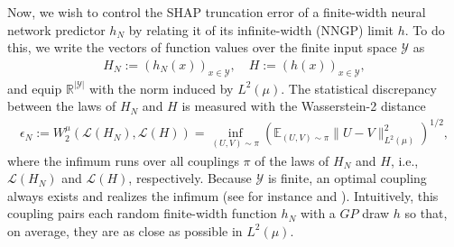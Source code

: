 \documentclass[letterpaper,11pt]{article}
\numberwithin{equation}{section}
\renewcommand{\leq}{\leqslant}
\numberwithin{equation}{section}
\begin{document}
Now, we wish to control the SHAP truncation error of a finite-width neural network predictor $h_N$ by relating it of its infinite-width (NNGP) limit $h$. To do this, we write the vectors of function values over the finite input space $\mathcal{Y}$ as
\begin{align}
    \label{def:HN:H:01}
    H_N:=(h_N(x))_{x\in \mathcal{Y}},\quad H:=(h(x))_{x\in \mathcal{Y}},
\end{align}
and equip $\mathbb{R}^{|\mathcal{Y}|}$ with the norm induced by $L^2(\mu)$. The statistical discrepancy between the laws of $H_N$ and $H$ is measured with the Wasserstein-2 distance
\begin{align}
    \label{def:epsilon:N:Wasserstein}
    \epsilon_N:=W_2^\mu (\mathcal{L}(H_N), \mathcal{L}(H))=\inf_{(U,V)\sim \pi} \left( \mathbb{E}_{(U,V)\sim \pi} \|U-V\|_{L^2(\mu)}^2 \right)^{1/2},
\end{align}
where the infimum runs over all couplings $\pi$ of the laws of $H_N$ and $H$, i.e., $\mathcal{L}(H_N)$ and $\mathcal{L}(H)$, respectively. Because $\mathcal{Y}$ is finite, an optimal coupling always exists and realizes the infimum (see for instance \cite{villani2021topics} and \cite{santambrogio2015optimal}). Intuitively, this coupling pairs each random finite-width function $h_N$ with a $GP$ draw $h$ so that, on average, they are as close as possible in $L^2(\mu)$.




\end{document}
